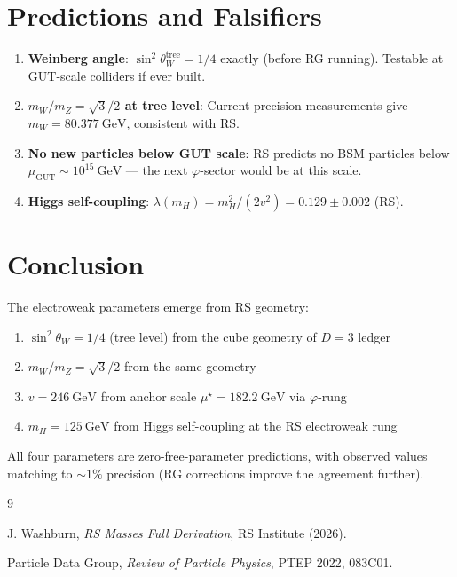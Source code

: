 \documentclass[12pt,a4paper]{article}
\theoremstyle{definition}
\theoremstyle{remark}
\begin{document}
\section{Predictions and Falsifiers}

\begin{enumerate}
\item \textbf{Weinberg angle}: $\sin^2\theta_W^\mathrm{tree} = 1/4$ exactly (before RG running). 
Testable at GUT-scale colliders if ever built.

\item \textbf{$m_W/m_Z = \sqrt{3}/2$ at tree level}: Current precision measurements 
give $m_W = 80.377~\mathrm{GeV}$, consistent with RS.

\item \textbf{No new particles below GUT scale}: RS predicts no BSM particles below 
$\mu_\mathrm{GUT} \sim 10^{15}~\mathrm{GeV}$ — the next $\varphi$-sector would be at this scale.

\item \textbf{Higgs self-coupling}: $\lambda(m_H) = m_H^2/(2v^2) = 0.129 \pm 0.002$ (RS).
\end{enumerate}

\section{Conclusion}

The electroweak parameters emerge from RS geometry:
\begin{enumerate}
\item $\sin^2\theta_W = 1/4$ (tree level) from the cube geometry of $D = 3$ ledger
\item $m_W/m_Z = \sqrt{3}/2$ from the same geometry
\item $v = 246~\mathrm{GeV}$ from anchor scale $\mu^\star = 182.2~\mathrm{GeV}$ via $\varphi$-rung
\item $m_H = 125~\mathrm{GeV}$ from Higgs self-coupling at the RS electroweak rung
\end{enumerate}

All four parameters are zero-free-parameter predictions, with observed values matching 
to $\sim 1\%$ precision (RG corrections improve the agreement further).

\begin{thebibliography}{9}

 J. Washburn, \emph{RS Masses Full Derivation}, RS Institute (2026).

 Particle Data Group, \emph{Review of Particle Physics}, PTEP 2022, 083C01.
\end{thebibliography}
\end{document}
